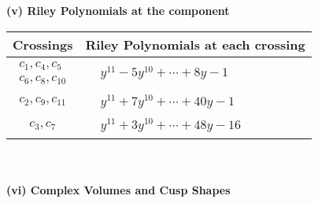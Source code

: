 \documentclass[1p]{elsarticle_modified}
\theoremstyle{definition}
\begin{document}
\newpage\renewcommand{\arraystretch}{1}
\flushleft \textbf{(v) Riley Polynomials at the component}\newline \\
\begin{tabular}{m{50pt}|m{274pt}}
Crossings & \hspace{64pt}Riley Polynomials at each crossing \\
\hline $$\begin{aligned}c_{1},c_{4},c_{5}\\c_{6},c_{8},c_{10}\end{aligned}$$&$\begin{aligned}
&y^{11}-5 y^{10}+\cdots+8 y-1
\end{aligned}$\\
\hline $$\begin{aligned}c_{2},c_{9},c_{11}\end{aligned}$$&$\begin{aligned}
&y^{11}+7 y^{10}+\cdots+40 y-1
\end{aligned}$\\
\hline $$\begin{aligned}c_{3},c_{7}\end{aligned}$$&$\begin{aligned}
&y^{11}+3 y^{10}+\cdots+48 y-16
\end{aligned}$\\
\hline
\end{tabular}\\~\\
\newpage\flushleft \textbf{(vi) Complex Volumes and Cusp Shapes}
\end{document}
